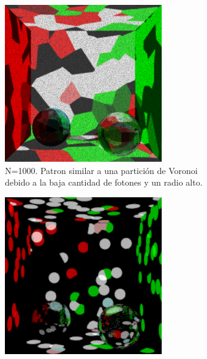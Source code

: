 \documentclass{article}
\begin{document}
\begin{figure}
\begin{subfigure}[h]{0.22\linewidth}
\includegraphics[width=\linewidth]{imgs/1k10kv.png}
\caption{N=1000. Patron similar a una partición de Voronoi debido a la baja cantidad de fotones y un radio alto.}
\end{subfigure}
\hfill
\begin{subfigure}[h]{0.22\linewidth}
\includegraphics[width=\linewidth]{imgs/1k10k.png}

\end{subfigure}
\end{figure}
\end{document}
